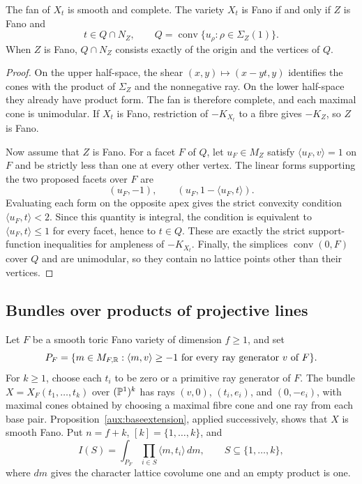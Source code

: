 \begin{proposition}\label{aux:baseextension}
The fan of $X_t$ is smooth and complete. The variety $X_t$ is Fano
if and only if $Z$ is Fano and
\[
 t\in Q\cap N_Z,\qquad
 Q=\operatorname{conv}\{u_\rho:\rho\in\Sigma_Z(1)\}.
\]
When $Z$ is Fano, $Q\cap N_Z$ consists exactly of the origin and
the vertices of $Q$.
\end{proposition}

\begin{proof}
On the upper half-space, the shear $(x,y)\mapsto(x-yt,y)$ identifies
the cones with the product of $\Sigma_Z$ and the nonnegative ray.
On the lower half-space they already have product form. The fan is
therefore complete, and each maximal cone is unimodular. If $X_t$ is Fano,
restriction of $-K_{X_t}$ to a fibre gives $-K_Z$, so $Z$ is Fano.

Now assume that $Z$ is Fano. For a facet $F$ of $Q$, let
$u_F\in M_Z$ satisfy $\langle u_F,v\rangle=1$ on $F$ and be
strictly less than one at every other vertex. The linear forms
supporting the two proposed facets over $F$ are
\[
 (u_F,-1),\qquad (u_F,1-\langle u_F,t\rangle).
\]
Evaluating each form on the opposite apex gives the strict convexity
condition $\langle u_F,t\rangle<2$. Since this quantity is integral,
the condition is equivalent to $\langle u_F,t\rangle\le1$ for every
facet, hence to $t\in Q$. These are exactly the strict support-function
inequalities for ampleness of $-K_{X_t}$. Finally, the simplices
$\operatorname{conv}(0,F)$ cover $Q$ and are unimodular, so they
contain no lattice points other than their vertices.
\end{proof}

\subsection{Bundles over products of projective lines}

Let $F$ be a smooth toric Fano variety of dimension $f\ge1$, and set
\[
 P_F=\{m\in M_{F,\mathbb{R}}:\langle m,v\rangle\ge-1
                       \text{ for every ray generator }v\text{ of }F\}.
\]
For $k\ge1$, choose each $t_i$ to be zero or a primitive ray
generator of $F$. The bundle $X=X_F(t_1,\ldots,t_k)$ over $(\mathbb{P}^1)^k$
has rays $(v,0)$, $(t_i,e_i)$, and $(0,-e_i)$, with maximal cones
obtained by choosing a maximal fibre cone and one ray from each
base pair. Proposition~\ref{aux:baseextension}, applied successively,
shows that $X$ is smooth Fano. Put $n=f+k$, $[k]=\{1,\ldots,k\}$, and
\[
 I(S)=\int_{P_F}\prod_{i\in S}\langle m,t_i\rangle\,dm,
 \qquad S\subseteq\{1,\ldots,k\},
\]
where $dm$ gives the character lattice covolume one and an empty
product is one.

